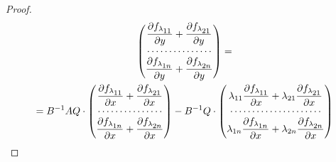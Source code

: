 \begin{proof}
\begin{multline}
\begin{pmatrix}

{\displaystyle \frac{\partial f_{\lambda_{\scriptstyle 11}}}{\partial y}+

\frac{\partial f_{\lambda_{\scriptstyle 21}}}{\partial y} }\\

\cdots\cdots\cdots\cdots\cdots\\

{\displaystyle\frac{\partial f_{\lambda_{\scriptstyle 1n}}}{\partial y}+

\frac{\partial f_{\lambda_{\scriptstyle 2n}}}{\partial y}\rule{0pt}{5mm} }

\end{pmatrix}=

\\

 =B^{-1}AQ\cdot

\begin{pmatrix}

{\displaystyle \frac{\partial f_{\lambda_{\scriptstyle 11}}}{\partial x}+

\frac{\partial f_{\lambda_{\scriptstyle 21}}}{\partial x} }\\

\cdots\cdots\cdots\cdots\cdots\\

{\displaystyle\frac{\partial f_{\lambda_{\scriptstyle 1n}}}{\partial x}+

\frac{\partial f_{\lambda_{\scriptstyle 2n}}}{\partial x} \rule{0pt}{5mm} }

\end{pmatrix}-

B^{-1}Q\cdot

\begin{pmatrix}

{\displaystyle\lambda_{11}

\frac{\partial f_{\lambda_{\scriptstyle 11}}}{\partial x}+

\lambda_{21}\frac{\partial f_{\lambda_{\scriptstyle 21}}}{\partial x} }\\

 \cdots\cdots\cdots\cdots\cdots\cdots\cdots\\

    {\displaystyle\lambda_{1n}

\frac{\partial f_{\lambda_{\scriptstyle 1n}}}{\partial x}+

\lambda_{2n}\frac{\partial f_{\lambda_{\scriptstyle 2 n}}}{\partial x}

}
\end{pmatrix}
\end{multline}
\end{proof}

